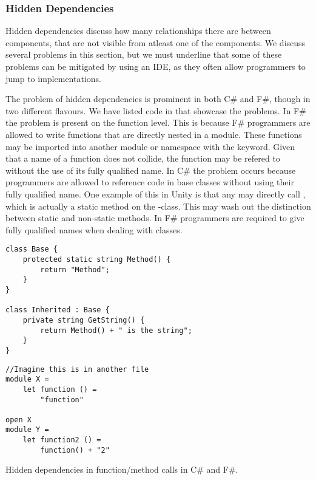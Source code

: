 \subsubsection{Hidden Dependencies}
Hidden dependencies discuss how many relationships there are between components, that are not visible from atleast one of the components. We discuss several problems in this section, but we must underline that some of these problems can be mitigated by using an \gls{IDE}, as they often allow programmers to jump to implementations.

The problem of hidden dependencies is prominent in both C\# and F\#, though in two different flavours. We have listed code in  that showcase the problems. In F\# the problem is present on the function level. This is because F\# programmers are allowed to write functions that are directly nested in a module. These functions may be imported into another module or namespace with the  keyword. Given that a name of a function does not collide, the function may be refered to without the use of its fully qualified name. In C\# the problem occurs because programmers are allowed to reference code in base classes without using their fully qualified name. One example of this in Unity is that any  may directly call , which is actually a static method on the -class. This may wash out the distinction between static and non-static methods. In F\# programmers are required to give fully qualified names when dealing with classes.

\begin{listing}[H]
    \begin{minipage}{.50\textwidth}
        \begin{verbatim}
class Base {
    protected static string Method() {
        return "Method";
    }
}

class Inherited : Base {
    private string GetString() {
        return Method() + " is the string";
    }
}
        \end{verbatim}
    \end{minipage}
    \hfill
    \begin{minipage}{.40\textwidth}
        \begin{verbatim}
//Imagine this is in another file
module X =
    let function () =
        "function"

open X
module Y =
    let function2 () =
        function() + "2"
        \end{verbatim}
    \end{minipage}
\caption{Hidden dependencies in function/method calls in C\# and F\#.}
\label{lst:hidden:dependencies}
\end{listing}

